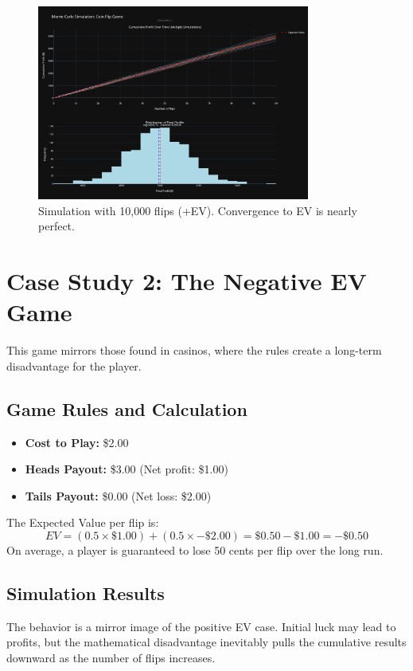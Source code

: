 \documentclass[12pt]{article}
\begin{document}
\begin{figure}[h!]
\centering
\includegraphics[width=0.8\textwidth]{+ev/10k+ev.png}
\caption{Simulation with 10,000 flips (+EV). Convergence to EV is nearly perfect.}
\end{figure}
\clearpage

\section{Case Study 2: The Negative EV Game}
This game mirrors those found in casinos, where the rules create a long-term disadvantage for the player.

\subsection{Game Rules and Calculation}
\begin{itemize}
    \item \textbf{Cost to Play:} \$2.00
    \item \textbf{Heads Payout:} \$3.00 (Net profit: \$1.00)
    \item \textbf{Tails Payout:} \$0.00 (Net loss: \$2.00)
\end{itemize}
The Expected Value per flip is:
\[
EV = (0.5 \times \$1.00) + (0.5 \times -\$2.00) = \$0.50 - \$1.00 = \boldsymbol{-\$0.50}
\]
On average, a player is guaranteed to lose 50 cents per flip over the long run.

\subsection{Simulation Results}
The behavior is a mirror image of the positive EV case. Initial luck may lead to profits, but the mathematical disadvantage inevitably pulls the cumulative results downward as the number of flips increases.
\end{document}
